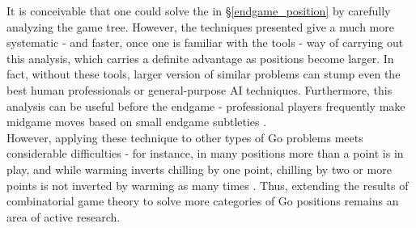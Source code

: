 \documentclass[../math194_paper.tex]{subfiles}
\begin{document}
It is conceivable that one could solve the  in \S \ref{endgame_position} by carefully analyzing 
the game tree. However, the techniques presented give a much more systematic - 
and faster, once one is familiar with the tools - way of carrying out this analysis,
which carries a definite advantage as positions become larger.
In fact, without these tools, larger version of similar problems can stump 
even the best human professionals or general-purpose AI techniques.
Furthermore, this analysis can be useful before the endgame - 
professional players frequently make midgame moves based on small endgame subtleties 
\cite[\S 5.1]{berlekamp1994mathematical}. \\

However, applying these technique to other types of Go problems meets considerable
difficulties - for instance, in many positions more than a point is in play, 
and while warming inverts chilling by one point, chilling by two or more points is not 
inverted by warming as many times \cite[\S 5.2]{berlekamp1994mathematical}.
Thus, extending the results of combinatorial game theory to solve more categories of Go positions 
remains an area of active research. 
\end{document}
